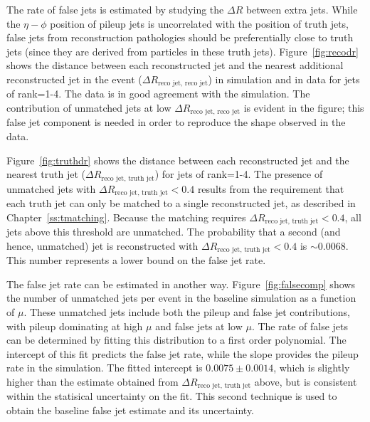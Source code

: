 The rate of false jets is estimated by studying the $\Delta {R}$ between extra jets. While the $\eta-\phi$ position of pileup jets is uncorrelated with the position of truth jets, false jets from reconstruction pathologies should be preferentially close to truth jets (since they are derived from particles in these truth jets).  
Figure~\ref{fig:recodr} shows the distance between each reconstructed jet and the nearest additional reconstructed jet in the event ($\Delta {R}_{\text{reco jet, reco jet}}$) in simulation and in data for jets of rank=1-4. The data is in good agreement with the simulation. 
The contribution of unmatched jets at low $\Delta {R}_{\text{reco jet, reco jet}}$ is evident in the figure;
this false jet component is needed in order to reproduce the shape observed in the data.


Figure~\ref{fig:truthdr} shows the distance between each reconstructed jet and the nearest truth jet ($\Delta {R}_{\text{reco jet, truth jet}}$) for jets of rank=1-4. The presence of unmatched jets with $\Delta {R}_{\text{reco jet, truth jet}} < 0.4$ results from the requirement that each truth jet can only be matched to a single reconstructed jet, as described in Chapter~\ref{ss:tmatching}. Because the matching requires $\Delta {R}_{\text{reco jet, truth jet}} < 0.4$, all jets above this threshold are unmatched. The probability that a second (and hence, unmatched) jet is reconstructed with $\Delta {R}_{\text{reco jet, truth jet}} < 0.4$ is $\sim 0.0068$.  This number represents a lower bound on the false jet rate.

The false jet rate can be estimated in another way. Figure~\ref{fig:falsecomp} shows the number of unmatched jets per event in the baseline simulation as a function of $\mu$. These unmatched jets include both the pileup and false jet contributions, with pileup dominating at high $\mu$ and false jets at low $\mu$. The rate of false jets can be determined by fitting this distribution to a first order polynomial. The intercept of this fit predicts the false jet rate, while the slope provides the pileup rate in the simulation. The fitted intercept is $0.0075 \pm   0.0014$, which is slightly higher than the estimate obtained from $\Delta {R}_{\text{reco jet, truth jet}}$ above, but is consistent
within the statisical uncertainty on the fit.   This second technique is used to obtain the baseline false jet estimate and its uncertainty.

